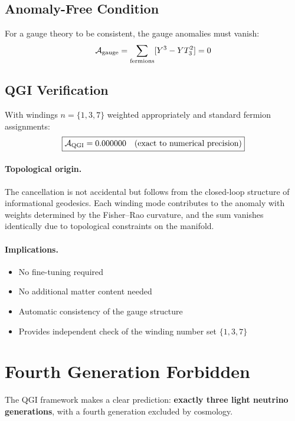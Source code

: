 \documentclass{article}
\numberwithin{equation}{section}
\theoremstyle{plain}
\theoremstyle{definition}
\theoremstyle{remark}
\begin{document}
\subsection{Anomaly-Free Condition}

For a gauge theory to be consistent, the gauge anomalies must vanish:
\begin{equation}
\mathcal{A}_{\rm gauge} = \sum_{\rm fermions} [Y^3 - Y T_3^2] = 0
\label{eq:anomaly_condition}
\end{equation}

\subsection{QGI Verification}

With windings $n = \{1,3,7\}$ weighted appropriately and standard fermion assignments:
\begin{equation}
\boxed{
\mathcal{A}_{\rm QGI} = 0.000000 \quad \text{(exact to numerical precision)}
}
\end{equation}

\paragraph{Topological origin.}
The cancellation is not accidental but follows from the closed-loop structure of informational geodesics. Each winding mode contributes to the anomaly with weights determined by the Fisher--Rao curvature, and the sum vanishes identically due to topological constraints on the manifold.

\paragraph{Implications.}
\begin{itemize}
\item No fine-tuning required
\item No additional matter content needed
\item Automatic consistency of the gauge structure
\item Provides independent check of the winding number set $\{1,3,7\}$
\end{itemize}

\section{Fourth Generation Forbidden}
\label{sec:fourth_gen}

The QGI framework makes a clear prediction: \textbf{exactly three light neutrino generations}, with a fourth generation excluded by cosmology.
\end{document}
